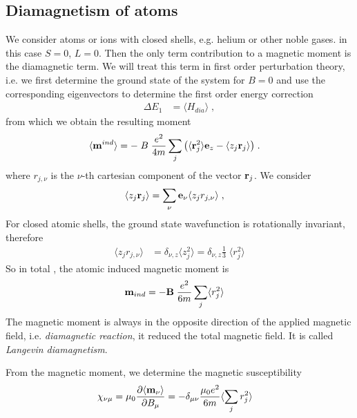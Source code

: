 \subsection{Diamagnetism of atoms}
We consider atoms or ions with closed shells, e.g. helium or other noble gases. in this case
$S=0$, $L=0$. Then the only term contribution to a magnetic moment is the diamagnetic term.
We will treat this term in first order perturbation theory, i.e. we first determine the ground state
of the system for $B=0$ and use the corresponding eigenvectors to determine the first order energy correction
%
\begin{align*}
\Delta E_{1} &= \langle H_{dia} \rangle\;,
\end{align*}
%
from which we obtain the resulting moment
%
\begin{align*}
\langle  \mathbf m^{ind}\rangle &=-\;
B\;\frac{e^{2} }{4 m} \sum_{j} \big( \langle \mathbf r_{j}^{2}\rangle 
\mathbf e_{z} - \langle z_{j} \mathbf r_{j}\rangle \big)\;.
\end{align*}
%
where $r_{j,\nu}$ is the $\nu$-th cartesian component  of the vector
$\mathbf r_{j}$. We consider
%
\begin{align*}
\langle z_{j} \mathbf r_{j} \rangle &=\sum_{\nu} \mathbf e_{\nu}
\langle z_{j} r_{j,\nu}\rangle\;,
\end{align*}
%
For closed atomic shells, the ground state wavefunction is rotationally invariant, therefore 
%
\begin{align*}
\langle z_{j} r_{j,\nu}\rangle &= \delta_{\nu,z}\langle z_{j}^{2}\rangle = \delta_{\nu,z}\frac{1}{3}\;\langle r_{j}^{2}\rangle
\end{align*}
%
So in total , the atomic induced magnetic moment is 
%
\begin{align*}
\mathbf m_{ind} &=-\mathbf B\;\frac{e^{2} }{6 m} \sum_{j} 
\langle r_{j}^{2} \rangle
\end{align*}
%
The magnetic moment is always in the opposite direction of the applied magnetic field,
i.e. {\em diamagnetic reaction}, it reduced the total magnetic field.
It is called {\em \color{blue} Langevin diamagnetism}. 

From the magnetic moment, we determine the magnetic susceptibility
%
\begin{align*}
\chi_{\nu\mu} &= \mu_{0}\frac{\partial\langle \mathbf m_{\nu} \rangle }{\partial B_{\mu}}
=-\delta_{\mu\nu} \frac{\mu_{0}e^{2}}{6m} \langle \sum_{j}r_{j}^{2} \rangle
\end{align*}
%


